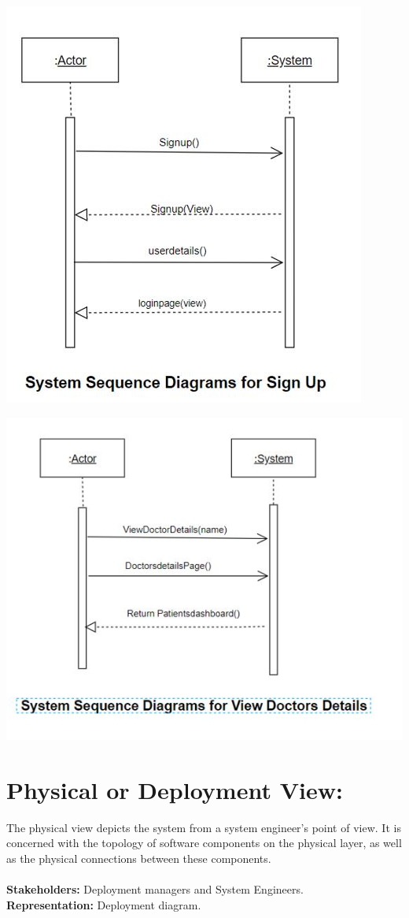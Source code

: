 \documentclass[a4paper,12pt]{report}
\begin{document}
\begin{center}
    \includegraphics{UML/Signup.JPG}
    \includegraphics{UML/Viewdoctor.JPG}
\end{center}


\section*{Physical or Deployment View:}
The physical view depicts the system from a system engineer's point of view. It is concerned with the topology of software components on the physical layer, as well as the physical connections between these components.\\\\
\textbf{Stakeholders:} Deployment managers and System Engineers.\\
\textbf{Representation:} Deployment diagram.
\end{document}
